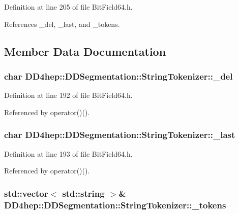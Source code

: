 Definition at line 205 of file BitField64.h.

References \_\-del, \_\-last, and \_\-tokens.

\subsection{Member Data Documentation}
\hypertarget{class_d_d4hep_1_1_d_d_segmentation_1_1_string_tokenizer_a0d18dc607eefcdae2de3f5b01d8294f5}{
\subsubsection[{\_\-del}]{\setlength{\rightskip}{0pt plus 5cm}char {\bf DD4hep::DDSegmentation::StringTokenizer::\_\-del}}}
\label{class_d_d4hep_1_1_d_d_segmentation_1_1_string_tokenizer_a0d18dc607eefcdae2de3f5b01d8294f5}


Definition at line 192 of file BitField64.h.

Referenced by operator()().\hypertarget{class_d_d4hep_1_1_d_d_segmentation_1_1_string_tokenizer_a3865b5d3ed0d300132963b9f214028e0}{
\subsubsection[{\_\-last}]{\setlength{\rightskip}{0pt plus 5cm}char {\bf DD4hep::DDSegmentation::StringTokenizer::\_\-last}}}
\label{class_d_d4hep_1_1_d_d_segmentation_1_1_string_tokenizer_a3865b5d3ed0d300132963b9f214028e0}


Definition at line 193 of file BitField64.h.

Referenced by operator()().\hypertarget{class_d_d4hep_1_1_d_d_segmentation_1_1_string_tokenizer_aac884d4330a88a11e4460ea9240cdb85}{
\subsubsection[{\_\-tokens}]{\setlength{\rightskip}{0pt plus 5cm}std::vector$<$ std::string $>$\& {\bf DD4hep::DDSegmentation::StringTokenizer::\_\-tokens}}}
\label{class_d_d4hep_1_1_d_d_segmentation_1_1_string_tokenizer_aac884d4330a88a11e4460ea9240cdb85}


